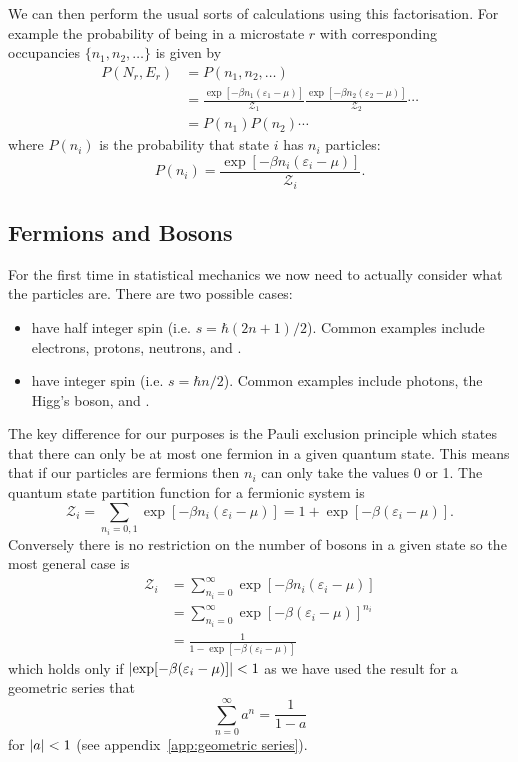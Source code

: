 \documentclass[a4paper]{article}
\newcommand{\partition}{\mathcal{Z}}
\begin{document}
    We can then perform the usual sorts of calculations using this factorisation.
    For example the probability of being in a microstate \(r\) with corresponding occupancies \(\{n_1, n_2, \dotsc\}\) is given by
    \begin{align*}
        P(N_r, E_r) &= P(n_1, n_2, \dotsc)\\
        &= \frac{\exp[-\beta n_1(\varepsilon_1 - \mu)]}{\partition_1} \frac{\exp[-\beta n_2(\varepsilon_2 - \mu)]}{\partition_2} \dotsm\\
        &= P(n_1)P(n_2)\dotsm
    \end{align*}
    where \(P(n_i)\) is the probability that state \(i\) has \(n_i\) particles:
    \[P(n_i) = \frac{\exp[-\beta n_i(\varepsilon_i - \mu)]}{\partition_i}.\]
    
    \subsection{Fermions and Bosons}
    For the first time in statistical mechanics we now need to actually consider what the particles are.
    There are two possible cases:
    \begin{itemize}
        \item {} have half integer spin (i.e. \(s = \hbar(2n + 1)/2\)).
        Common examples include electrons, protons, neutrons, and .
        \item {} have integer spin (i.e. \(s = \hbar n/2\)).
        Common examples include photons, the Higg's boson, and .
    \end{itemize}
    The key difference for our purposes is the Pauli exclusion principle which states that there can only be at most one fermion in a given quantum state.
    This means that if our particles are fermions then \(n_i\) can only take the values 0 or 1.
    The quantum state partition function for a fermionic system is
    \[\partition_i = \sum_{n_i = 0, 1} \exp[-\beta n_i(\varepsilon_i - \mu)] = 1 + \exp[-\beta(\varepsilon_i - \mu)].\]
    Conversely there is no restriction on the number of bosons in a given state so the most general case is
    \begin{align*}
        \partition_i &= \sum_{n_i = 0}^{\infty} \exp[-\beta n_i(\varepsilon_i - \mu)]\\
        &= \sum_{n_i=0}^{\infty} \exp[-\beta(\varepsilon_i - \mu)]^{n_i}\\
        &= \frac{1}{1 - \exp[-\beta(\varepsilon_i - \mu)]}
    \end{align*}
    which holds only if \(\abs{\exp[-\beta(\varepsilon_i-\mu)]}<1\) as we have used the result for a geometric series that
    \[\sum_{n=0}^{\infty} a^n = \frac{1}{1 - a}\]
    for \(\abs{a} < 1\) (see appendix~\ref{app:geometric series}).
    
\end{document}
